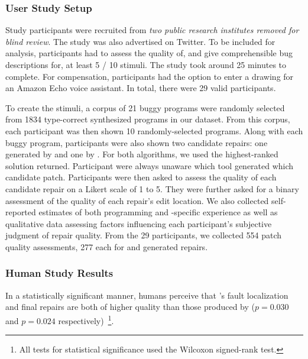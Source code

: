 \subsubsection{User Study Setup}
\label{subsec:eval:qual_study_setup}

Study participants were recruited from \emph{two public research
institutes removed for blind review}. The study was also advertised on Twitter.
To be included for analysis, participants had to assess the quality of, and give
comprehensible bug descriptions for, at least 5 / 10 stimuli. The study took around
25 minutes to complete. For compensation, participants had the option to enter a
drawing for an Amazon Echo voice assistant. In total, there were
29 valid participants.

To create the stimuli, a corpus of 21 buggy programs were randomly selected from
1834 type-correct synthesized programs in our dataset. From this corpus, each
participant was then shown 10 randomly-selected programs. Along with each buggy
program, participants were also shown two candidate repairs: one generated by
\toolname and one by \seminal. For both algorithms, we used the highest-ranked
solution returned. Participant were always unaware which tool generated which
candidate patch. Participants were then asked to assess the quality of each
candidate repair on a Likert scale of 1 to 5. They were further asked for a
binary assessment of the quality of each repair's edit location.
We also collected self-reported estimates of both programming and
\ocaml-specific experience as well as qualitative data assessing factors
influencing each participant's subjective judgment of repair quality.
From the 29 participants, we collected 554 patch quality assessments, 277 each
for \toolname and \seminal generated repairs.


\subsubsection{Human Study Results}
\label{subsec:eval:study_res}

In a statistically significant manner, humans perceive that
\toolname's fault localization and final repairs are both of higher quality
than those produced by \seminal ($p=0.030$ and $p=0.024$
respectively)~\footnote{All tests for statistical significance used the
Wilcoxon signed-rank test.}.

